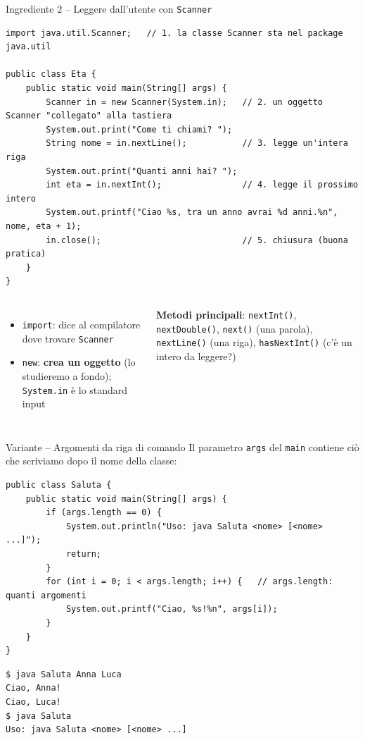 \documentclass[10pt,aspectratio=169]{beamer}
\begin{document}
\begin{frame}[fragile]{Ingrediente 2 -- Leggere dall'utente con \texttt{Scanner}}
\begin{lstlisting}
import java.util.Scanner;   // 1. la classe Scanner sta nel package java.util

public class Eta {
    public static void main(String[] args) {
        Scanner in = new Scanner(System.in);   // 2. un oggetto Scanner "collegato" alla tastiera
        System.out.print("Come ti chiami? ");
        String nome = in.nextLine();           // 3. legge un'intera riga
        System.out.print("Quanti anni hai? ");
        int eta = in.nextInt();                // 4. legge il prossimo intero
        System.out.printf("Ciao %s, tra un anno avrai %d anni.%n", nome, eta + 1);
        in.close();                            // 5. chiusura (buona pratica)
    }
}
\end{lstlisting}

\begin{columns}[T]
\small
\begin{itemize}\itemsep=0pt
    \item \texttt{import}: dice al compilatore dove trovare \texttt{Scanner}
    \item \texttt{new}: \textbf{crea un oggetto} (lo studieremo a fondo); \texttt{System.in} è lo standard input
\end{itemize}
\small
\textbf{Metodi principali}: \texttt{nextInt()}, \texttt{nextDouble()}, \texttt{next()} (una parola), \texttt{nextLine()} (una riga), \texttt{hasNextInt()} (c'è un intero da leggere?)
\end{columns}
\end{frame}

\begin{frame}[fragile]{Variante -- Argomenti da riga di comando}
Il parametro \texttt{args} del \texttt{main} contiene ciò che scriviamo dopo il nome della classe:
\begin{lstlisting}
public class Saluta {
    public static void main(String[] args) {
        if (args.length == 0) {
            System.out.println("Uso: java Saluta <nome> [<nome> ...]");
            return;
        }
        for (int i = 0; i < args.length; i++) {   // args.length: quanti argomenti
            System.out.printf("Ciao, %s!%n", args[i]);
        }
    }
}
\end{lstlisting}
\begin{lstlisting}[style=shell]
$ java Saluta Anna Luca
Ciao, Anna!
Ciao, Luca!
$ java Saluta
Uso: java Saluta <nome> [<nome> ...]
\end{lstlisting}
\end{frame}
\end{document}
